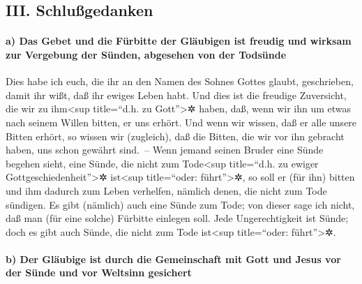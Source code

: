 \hypertarget{iii.-schluuxdfgedanken}{%
\subsection{III. Schlußgedanken}\label{iii.-schluuxdfgedanken}}

\hypertarget{a-das-gebet-und-die-fuxfcrbitte-der-gluxe4ubigen-ist-freudig-und-wirksam-zur-vergebung-der-suxfcnden-abgesehen-von-der-todsuxfcnde}{%
\paragraph{a) Das Gebet und die Fürbitte der Gläubigen ist freudig und
wirksam zur Vergebung der Sünden, abgesehen von der
Todsünde}\label{a-das-gebet-und-die-fuxfcrbitte-der-gluxe4ubigen-ist-freudig-und-wirksam-zur-vergebung-der-suxfcnden-abgesehen-von-der-todsuxfcnde}}

 Dies habe ich euch, die ihr an den Namen des Sohnes
Gottes glaubt, geschrieben, damit ihr wißt, daß ihr ewiges Leben habt.
 Und dies ist die freudige Zuversicht, die wir zu
ihm\textless sup title=``d.h. zu Gott''\textgreater✲ haben, daß, wenn
wir ihn um etwas nach seinem Willen bitten, er uns erhört.
 Und wenn wir wissen, daß er alle unsere Bitten erhört,
so wissen wir (zugleich), daß die Bitten, die wir vor ihn gebracht
haben, uns schon gewährt sind.~--  Wenn jemand seinen
Bruder eine Sünde begehen sieht, eine Sünde, die nicht zum
Tode\textless sup title=``d.h. zu ewiger
Gottgeschiedenheit''\textgreater✲ ist\textless sup title=``oder:
führt''\textgreater✲, so soll er (für ihn) bitten und ihm dadurch zum
Leben verhelfen, nämlich denen, die nicht zum Tode sündigen. Es gibt
(nämlich) auch eine Sünde zum Tode; von dieser sage ich nicht, daß man
(für eine solche) Fürbitte einlegen soll.  Jede
Ungerechtigkeit ist Sünde; doch es gibt auch Sünde, die nicht zum Tode
ist\textless sup title=``oder: führt''\textgreater✲.

\hypertarget{b-der-gluxe4ubige-ist-durch-die-gemeinschaft-mit-gott-und-jesus-vor-der-suxfcnde-und-vor-weltsinn-gesichert}{%
\paragraph{b) Der Gläubige ist durch die Gemeinschaft mit Gott und Jesus
vor der Sünde und vor Weltsinn
gesichert}\label{b-der-gluxe4ubige-ist-durch-die-gemeinschaft-mit-gott-und-jesus-vor-der-suxfcnde-und-vor-weltsinn-gesichert}}

